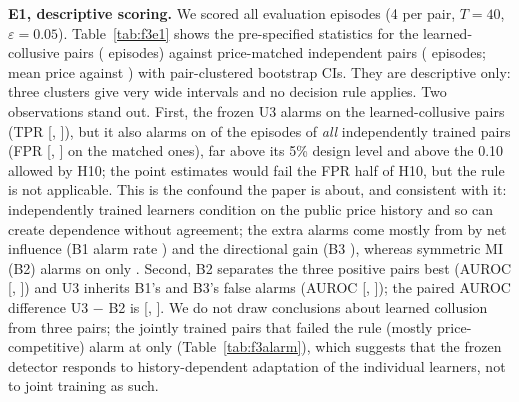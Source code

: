 \documentclass[11pt]{article}
\begin{document}
\textbf{E1, descriptive scoring.} We scored all \fEvalEpisodes{} evaluation episodes (4 per pair, $T{=}40$, $\varepsilon{=}0.05$). Table~\ref{tab:f3e1} shows the pre-specified statistics for the \fPosPairs{} learned-collusive pairs (\fNPosEp{} episodes) against \fPosPairs{} price-matched independent pairs (\fNNegEp{} episodes; mean price \fPricePos{} against \fPriceMatched{}) with pair-clustered bootstrap CIs. They are descriptive only: three clusters give very wide intervals and no decision rule applies. Two observations stand out. First, the frozen U3 alarms on the learned-collusive pairs (TPR \fEoneTprUthree{} [\fEoneTprUthreeLo{}, \fEoneTprUthreeHi{}]), but it also alarms on \fAlarmIndUthree{} of the episodes of \emph{all} independently trained pairs (FPR \fEoneFprUthree{} [\fEoneFprUthreeLo{}, \fEoneFprUthreeHi{}] on the matched ones), far above its 5\% design level and above the 0.10 allowed by H10; the point estimates would fail the FPR half of H10, but the rule is not applicable. This is the confound the paper is about, and consistent with it: independently trained learners condition on the public price history and so can create dependence without agreement; the extra alarms come mostly from by net influence (B1 alarm rate \fAlarmIndBone{}) and the directional gain (B3 \fAlarmIndBthree{}), whereas symmetric MI (B2) alarms on only \fAlarmIndBtwo{}. Second, B2 separates the three positive pairs best (AUROC \fEoneAurocBtwo{} [\fEoneAurocBtwoLo{}, \fEoneAurocBtwoHi{}]) and U3 inherits B1's and B3's false alarms (AUROC \fEoneAurocUthree{} [\fEoneAurocUthreeLo{}, \fEoneAurocUthreeHi{}]); the paired AUROC difference U3 $-$ B2 is \fEonePairedAuroc{} [\fEonePairedAurocLo{}, \fEonePairedAurocHi{}]. We do not draw conclusions about learned collusion from three pairs; the jointly trained pairs that failed the rule (mostly price-competitive) alarm at only \fAlarmUnlUthree{} (Table~\ref{tab:f3alarm}), which suggests that the frozen detector responds to history-dependent adaptation of the individual learners, not to joint training as such.
\begin{table}[t]\centering\small\resizebox{\linewidth}{!}{}
\caption{E1, descriptive (3 positive pairs, 12 episodes against 12 price-matched negatives; right block: all 60 independent pairs, 240 episodes). Frozen thresholds; CIs resample pairs. Price AUROC is a non-detector reference.}\label{tab:f3e1}\end{table}
\begin{table}[t]\centering\small
\caption{Fraction of evaluation episodes on which each frozen detector alarms, by group (E1).}\label{tab:f3alarm}\end{table}
\end{document}
